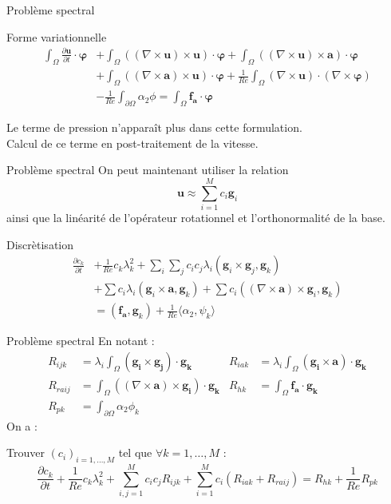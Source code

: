 \documentclass{beamer}
\newcommand{\rot}{{\nabla\times}}
\begin{document}
\begin{frame}{Problème spectral}
\begin{block}{Forme variationnelle}
\begin{align*}
\int_\Omega \frac{\partial \mathbf{u}}{\partial t}\cdot \bm{\varphi} &+ \int_\Omega ((\rot \mathbf{u})\times \mathbf{u})\cdot \bm{\varphi} + \int_\Omega ((\rot \mathbf{u})\times \mathbf{a})\cdot\bm{\varphi} \\
&+ \int_\Omega ((\rot \mathbf{a})\times \mathbf{u})\cdot\bm{\varphi} + \frac{1}{Re}\int_\Omega (\rot \mathbf{u})\cdot(\rot\bm{\varphi}) \\
&-\frac{1}{Re}\int_{\partial\Omega} \alpha_2\phi = \int_\Omega \mathbf{f_a}\cdot\bm{\varphi}
\end{align*}
\end{block}
Le terme de pression n'apparaît plus dans cette formulation.\\
Calcul de ce terme en post-traitement de la vitesse.
\end{frame}

\begin{frame}{Problème spectral}
On peut maintenant utiliser la relation 
\[ \mathbf{u}\approx\sum_{i=1}^M c_i\mathbf{g}_i \]
ainsi que la linéarité de l'opérateur rotationnel et l'orthonormalité de la base.
\begin{block}{Discrètisation}
\begin{align*}
\frac{\partial c_k}{\partial t} &+ \frac{1}{Re}c_k\lambda_k^2 + \sum_i\sum_j c_i c_j\lambda_i(\mathbf{g}_i\times \mathbf{g}_j, \mathbf{g}_k)\\
& + \sum c_i\lambda_i(\mathbf{g}_i\times \mathbf{a},\mathbf{g}_k) + \sum c_i((\rot \mathbf{a})\times \mathbf{g}_i, \mathbf{g}_k)\\
& = (\mathbf{f_a},\mathbf{g}_k) + \frac{1}{Re}\langle\alpha_2,\psi_k\rangle
\end{align*}
\end{block}
\end{frame}

\begin{frame}{Problème spectral}
En notant :
\begin{align*}
R_{ijk} &= \lambda_i\int_\Omega(\mathbf{g_i}\times \mathbf{g_j})\cdot\mathbf{g_k} & R_{iak} &= \lambda_i\int_\Omega(\mathbf{g_i}\times \mathbf{a})\cdot\mathbf{g_k}\\
R_{raij} &= \int_\Omega((\rot\mathbf{a})\times \mathbf{g_i})\cdot\mathbf{g_k} & R_{hk} &= \int_\Omega\mathbf{f_a}\cdot\mathbf{g_k}\\
R_{pk} &= \int_{\partial\Omega} \alpha_2\phi_k
\end{align*}
On a :
\begin{block}{Trouver $(c_i)_{i=1,\dots,M}$ tel que $\forall k=1,\dots,M$ :}
\[ \frac{\partial c_k}{\partial t} + \frac{1}{Re}c_k\lambda_k^2 + \sum_{i,j=1}^Mc_ic_jR_{ijk} + \sum_{i=1}^Mc_i\left(R_{iak} + R_{raij}\right) = R_{hk} + \frac{1}{Re}R_{pk} \]
\end{block}
\end{frame}
\end{document}
